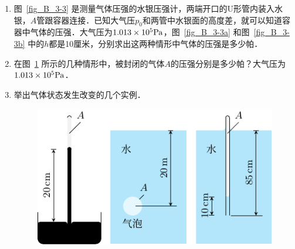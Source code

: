 \begin{enumerate}
    \item 图~\ref{fig_B_3-3} 是测量气体压强的水银压强计，两端开口的U形管内装入水银，$A$管跟容器连接．已知大气压$p_0$和两管中水银面的高度差，就可以知道容器中气体的压强．大气压为$1.013\times 10^5{\rm Pa}$，图~\ref{fig_B_3-3a} 和图~\ref{fig_B_3-3b} 中的$h$都是10厘米，分别求出这两种情形中气体的压强是多少帕．
    \item 在图~\ref{fig_B_3-4} 所示的几种情形中，被封闭的气体$A$的压强分别是多少帕？大气压为$1.013\times 10^5{\rm Pa}$．
    \item 举出气体状态发生改变的几个实例．
\begin{figure}[htbp]
    \centering
    \includegraphics{fig/B/3-4.pdf}
    \caption{}\label{fig_B_3-4}
\end{figure}

\end{enumerate}

